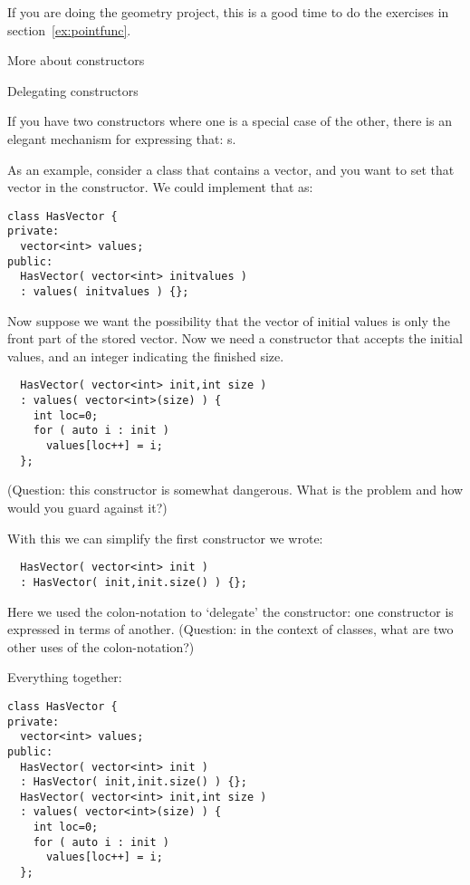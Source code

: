

\begin{exercise}
  If you are doing the geometry project,
  this is a good time to do the exercises in section~\ref{ex:pointfunc}.
\end{exercise}

 {More about constructors}

 {Delegating constructors}
\label{sec:construct-delegate}

If you have two constructors where one is a special case of the other,
there is an elegant mechanism for expressing that:
s.

As an example, consider a class that contains a vector,
and you want to set that vector in the constructor.
We could implement that as:
\begin{lstlisting}
class HasVector {
private:
  vector<int> values;
public:
  HasVector( vector<int> initvalues )
  : values( initvalues ) {};
\end{lstlisting}
Now suppose we want the possibility that
the vector of initial values
is only the front part of the stored vector.
Now we need a constructor that accepts
the initial values, and an integer indicating
the finished size.
\begin{lstlisting}
  HasVector( vector<int> init,int size )
  : values( vector<int>(size) ) {
    int loc=0;
    for ( auto i : init )
      values[loc++] = i;
  };
\end{lstlisting}
(Question: this constructor is somewhat dangerous.
What is the problem and how would you guard against it?)

With this we can simplify the first constructor we wrote:
\begin{lstlisting}
  HasVector( vector<int> init )
  : HasVector( init,init.size() ) {};
\end{lstlisting}
Here we used the colon-notation to `delegate' the constructor:
one constructor is expressed in terms of another.
(Question: in the context of classes, what are
two other uses of the colon-notation?)

Everything together:
\begin{lstlisting}
class HasVector {
private:
  vector<int> values;
public:
  HasVector( vector<int> init )
  : HasVector( init,init.size() ) {};
  HasVector( vector<int> init,int size )
  : values( vector<int>(size) ) {
    int loc=0;
    for ( auto i : init )
      values[loc++] = i;
  };
\end{lstlisting}

